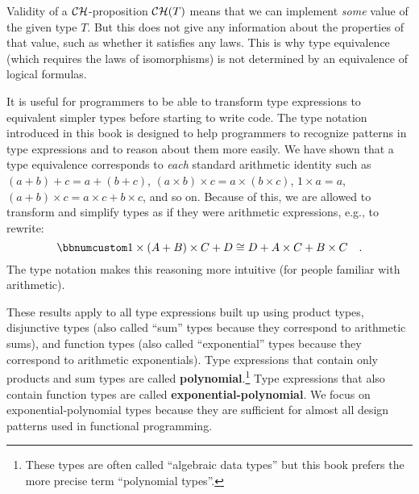 Validity of a ${\cal CH}$-proposition ${\cal CH}(T)$ means that
we can implement \emph{some} value of the given type $T$. But this
does not give any information about the properties of that value,
such as whether it satisfies any laws. This is why type equivalence
(which requires the laws of isomorphisms) is not determined by an
equivalence of logical formulas.

It is useful for programmers to be able to transform type expressions
to equivalent simpler types before starting to write code. The type
notation introduced in this book is designed to help programmers to
recognize patterns in type expressions and to reason about them more
easily. We have shown that a type equivalence corresponds to \emph{each}
standard arithmetic identity such as $\left(a+b\right)+c=a+\left(b+c\right)$,
$\left(a\times b\right)\times c=a\times(b\times c)$, $1\times a=a$,
$\left(a+b\right)\times c=a\times c+b\times c$, and so on. Because
of this, we are allowed to transform and simplify types as if they
were arithmetic expressions, e.g., to rewrite:
\[
\bbnum 1\times\left(A+B\right)\times C+D\cong D+A\times C+B\times C\quad.
\]
The type notation makes this reasoning more intuitive (for people
familiar with arithmetic). 

These results apply to all type expressions built up using product
types, disjunctive types (also called \textsf{``}sum\textsf{''} types because they
correspond to arithmetic sums), and function types (also called \textsf{``}exponential\textsf{''}
types because they correspond to arithmetic exponentials). Type expressions
that contain only products and sum types are called \textbf{polynomial}.\footnote{These types are often called \textsf{``}algebraic data types\textsf{''}
but this book prefers the more precise term \textsf{``}polynomial types\textsf{''}.} Type expressions that also contain function types are called \textbf{exponential-polynomial}.
We focus on exponential-polynomial types because they are sufficient
for almost all design patterns used in functional programming.

